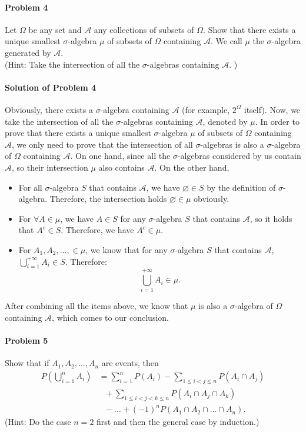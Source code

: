 \documentclass{article}
\begin{document}
\paragraph{Problem 4} Let $\Omega$ be any set and $\mathcal A$ any collections of subsets of $\Omega$. Show that there exists a unique smallest $\sigma$-algebra $\mu$ of subsets of $\Omega$ containing $\mathcal A$. We call $\mu$ the $\sigma$-algebra generated by $\mathcal A$. \\
(Hint: Take the intersection of all the $\sigma$-algebras containing $\mathcal A$. )

\paragraph{Solution of Problem 4} Obviously, there exists a $\sigma$-algebra containing $\mathcal A$ (for example, $2^{\Omega}$ itself). Now, we take the intersection of all the $\sigma$-algebras containing $\mathcal A$, denoted by $\mu$. In order to prove that there exists a unique smallest $\sigma$-algebra $\mu$ of subsets of $\Omega$ containing $\mathcal A$, we only need to prove that the intersection of all $\sigma$-algebras is also a $\sigma$-algebra of $\Omega$ containing $\mathcal A$. On one hand, since all the $\sigma$-algebras considered by us contain $\mathcal A$, so their intersection $\mu$ also contains $\mathcal A$. On the other hand,
\begin{itemize}
\item For all $\sigma$-algebra $S$ that contains $\mathcal A$, we have $\varnothing \in S$ by the definition of $\sigma$-algebra. Therefore, the intersection holds $\varnothing\in \mu$ obviously. 
\item For $\forall A\in\mu$, we have $A\in S$ for any $\sigma$-algebra $S$ that contains $\mathcal A$, so it holds that $A^c\in S$. Therefore, we have $A^c\in\mu$. 
\item For $A_1, A_2, \ldots, \in\mu$, we know that for any $\sigma$-algebra $S$ that contains $\mathcal A$, $\bigcup_{i=1}^{+\infty} A_i\in S$. Therefore:
\[\bigcup_{i=1}^{+\infty} A_i\in \mu.\]
\end{itemize}
After combining all the items above, we know that $\mu$ is also a $\sigma$-algebra of $\Omega$ containing $\mathcal A$, which comes to our conclusion. 

\paragraph{Problem 5} Show that if $A_1, A_2,\ldots, A_n$ are events, then
\begin{equation*}
\begin{aligned}
P\left(\bigcup_{i=1}^{n}A_i\right) &= \sum_{i=1}^{n} P(A_i) -\sum_{1\leqslant i<j\leqslant n}P(A_i\cap A_j)\\
&~~~+ \sum_{1\leqslant i<j<k\leqslant n} P(A_i\cap A_j\cap A_k)\\
&~~~-\ldots+(-1)^n P(A_1\cap A_2\cap\ldots\cap A_n).
\end{aligned}    
\end{equation*}
(Hint: Do the case $n=2$ first and then the general case by induction.)
 
\end{document}
